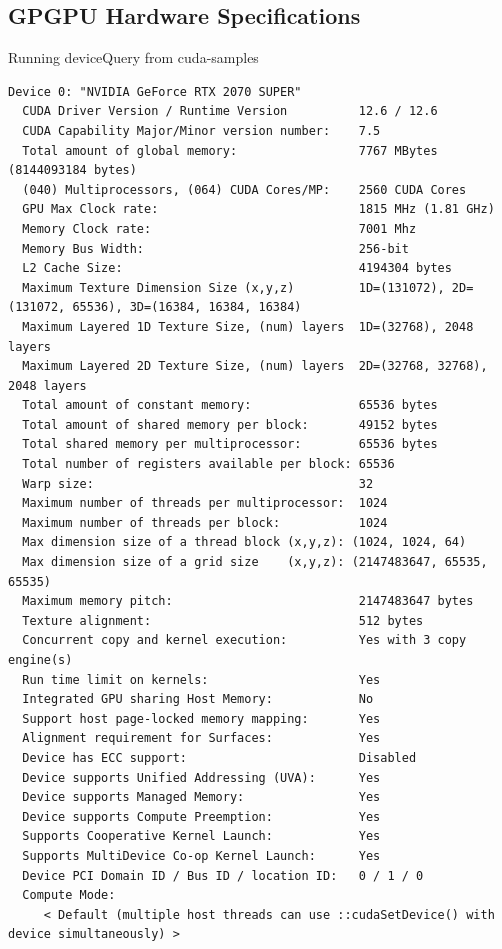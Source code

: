 \documentclass[11pt,a4paper]{article}
\begin{document}
\subsection{GPGPU Hardware Specifications}
Running deviceQuery from cuda-samples
\begin{lstlisting}
Device 0: "NVIDIA GeForce RTX 2070 SUPER"
  CUDA Driver Version / Runtime Version          12.6 / 12.6
  CUDA Capability Major/Minor version number:    7.5
  Total amount of global memory:                 7767 MBytes (8144093184 bytes)
  (040) Multiprocessors, (064) CUDA Cores/MP:    2560 CUDA Cores
  GPU Max Clock rate:                            1815 MHz (1.81 GHz)
  Memory Clock rate:                             7001 Mhz
  Memory Bus Width:                              256-bit
  L2 Cache Size:                                 4194304 bytes
  Maximum Texture Dimension Size (x,y,z)         1D=(131072), 2D=(131072, 65536), 3D=(16384, 16384, 16384)
  Maximum Layered 1D Texture Size, (num) layers  1D=(32768), 2048 layers
  Maximum Layered 2D Texture Size, (num) layers  2D=(32768, 32768), 2048 layers
  Total amount of constant memory:               65536 bytes
  Total amount of shared memory per block:       49152 bytes
  Total shared memory per multiprocessor:        65536 bytes
  Total number of registers available per block: 65536
  Warp size:                                     32
  Maximum number of threads per multiprocessor:  1024
  Maximum number of threads per block:           1024
  Max dimension size of a thread block (x,y,z): (1024, 1024, 64)
  Max dimension size of a grid size    (x,y,z): (2147483647, 65535, 65535)
  Maximum memory pitch:                          2147483647 bytes
  Texture alignment:                             512 bytes
  Concurrent copy and kernel execution:          Yes with 3 copy engine(s)
  Run time limit on kernels:                     Yes
  Integrated GPU sharing Host Memory:            No
  Support host page-locked memory mapping:       Yes
  Alignment requirement for Surfaces:            Yes
  Device has ECC support:                        Disabled
  Device supports Unified Addressing (UVA):      Yes
  Device supports Managed Memory:                Yes
  Device supports Compute Preemption:            Yes
  Supports Cooperative Kernel Launch:            Yes
  Supports MultiDevice Co-op Kernel Launch:      Yes
  Device PCI Domain ID / Bus ID / location ID:   0 / 1 / 0
  Compute Mode:
     < Default (multiple host threads can use ::cudaSetDevice() with device simultaneously) >

\end{lstlisting}
\end{document}
